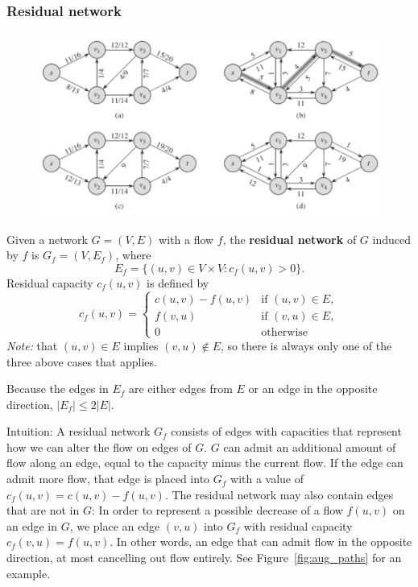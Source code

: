 \subsubsection{Residual network}
\begin{figure}
	\centering
	\includegraphics[width=\textwidth]{images/augmenting_paths}
\end{figure}
Given a network $G = (V,E)$ with a flow $f$, the \textbf{residual network}
of $G$ induced by $f$ is $G_f = (V, E_f)$, where
\[
	E_f = \{(u,v) \in V \times V : c_f(u,v) > 0\}.
\]
Residual capacity $c_f(u,v)$ is defined by
\[
 c_f(u,v) =
  \begin{cases}
  	c(u,v) - f(u,v) & \text{if } (u,v) \in E, \\
  	f(v,u) & \text{if } (v,u) \in E, \\
  	0 & \text{otherwise}
  \end{cases}
\]
\textit{Note:} that $(u,v) \in E$ implies $(v,u) \notin E$, so there is always only one of the three
above cases that applies. 

Because the edges in $E_f$ are either edges from $E$ or an edge in the opposite direction,
$|E_f| \leq 2|E|$.

Intuition: A residual network $G_f$ consists of edges with capacities that
represent how we can alter the flow on edges of $G$. $G$ can admit an
additional amount of flow along an edge, equal to the capacity minus the
current flow. If the edge can admit more flow, that edge is placed into $G_f$
with a value of $c_f(u,v) = c(u,v) - f(u,v)$. The residual network may also
contain edges that are not in $G$: In order to represent a possible decrease
of a flow $f(u,v)$ on an edge in $G$, we place an edge $(v,u)$ into $G_f$ with
residual capacity $c_f(v,u) = f(u,v)$. In other words, an edge that can admit
flow in the opposite direction, at most cancelling out flow entirely. See
Figure~\ref{fig:aug_paths} for an example.

